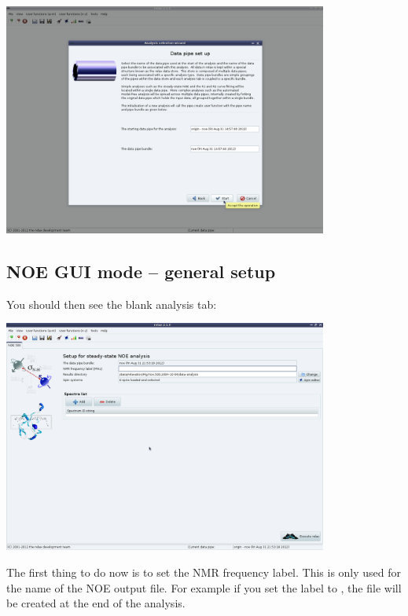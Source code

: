 \begin{minipage}[h]{\linewidth}
\centerline{\includegraphics[width=0.8\textwidth, bb=14 14 1415 1019]{graphics/screenshots/noe_analysis/analysis_wizard2}}
\end{minipage}



\subsection{NOE GUI mode -- general setup}

You should then see the blank analysis tab:

\begin{minipage}[h]{\linewidth}
\centerline{\includegraphics[width=0.8\textwidth, bb=14 14 1415 1019]{graphics/screenshots/noe_analysis/blank}}
\end{minipage}

The first thing to do now is to set the NMR frequency label.
This is only used for the name of the NOE output file.
For example if you set the label to , the file  will be created at the end of the analysis.

